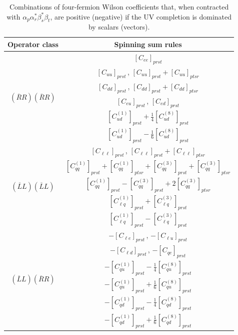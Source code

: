 \documentclass[a4paper,11pt]{article}
\begin{document}
\begin{table}[h!t!b!]
\renewcommand{\arraystretch}{1.5}
    \centering
    \begin{tabular}{cc}
    \toprule
    \rowcolor{hdrcolor}
    \textbf{Operator class} & \textbf{Spinning sum rules} \\
    \midrule
    \multirow{6}{*}{\boldmath$(\overline{R}R)(\overline{R}R)$} &
    $[C_{ee}]_{prst}$ \\
    & $[C_{uu}]_{prst}$\,, \qquad $[C_{uu}]_{prst} + [C_{uu}]_{ptsr}$ \\
    & $[C_{dd}]_{prst}$\,, \qquad $[C_{dd}]_{prst} + [C_{dd}]_{ptsr}$ \\
    & $[C_{eu}]_{prst}$\,, \qquad $[C_{ed}]_{prst}$ \\
    & $[C_{ud}^{(1)}]_{prst}+\tfrac{1}{4}[C_{ud}^{(8)}]_{prst}$ \\
    & $[C_{ud}^{(1)}]_{prst}-\tfrac{1}{6}[C_{ud}^{(8)}]_{prst}$ \\
    \midrule
    \multirow{5}{*}{\boldmath$(\overline{L}L)(\overline{L}L)$} &
    $[C_{\ell\ell}]_{prst}$\,, \qquad $[C_{\ell\ell}]_{prst} + [C_{\ell\ell}]_{ptsr}$ \\
    & $[C_{qq}^{(1)}]_{prst} + [C_{qq}^{(1)}]_{ptsr} + [C_{qq}^{(3)}]_{prst} + [C_{qq}^{(3)}]_{ptsr}$ \\
    & $[C_{qq}^{(1)}]_{prst} - [C_{qq}^{(3)}]_{prst} + 2[C_{qq}^{(3)}]_{ptsr}$ \\
    & $[C_{\ell q}^{(1)}]_{prst} + [C_{\ell q}^{(3)}]_{prst}$ \\
    & $[C_{\ell q}^{(1)}]_{prst} - [C_{\ell q}^{(3)}]_{prst}$ \\
    \midrule
    \multirow{6}{*}{\boldmath$(\overline{L}L)(\overline{R}R)$} &
    $-[C_{\ell e}]_{prst}$\,, \qquad $-[C_{\ell u}]_{prst}$ \\
    & $-[C_{\ell d}]_{prst}$\,, \qquad $-[C_{qe}]_{prst}$ \\
    & $-[C_{qu}^{(1)}]_{prst} - \tfrac{1}{4}[C_{qu}^{(8)}]_{prst}$ \\
    & $-[C_{qu}^{(1)}]_{prst} + \tfrac{1}{6}[C_{qu}^{(8)}]_{prst}$ \\
    & $-[C_{qd}^{(1)}]_{prst} - \tfrac{1}{4}[C_{qd}^{(8)}]_{prst}$ \\
    & $-[C_{qd}^{(1)}]_{prst} + \tfrac{1}{6}[C_{qd}^{(8)}]_{prst}$ \\
    \bottomrule
    \end{tabular}
    \caption{Combinations of four-fermion Wilson coefficients that, when contracted with $\alpha_p \alpha_r^* \beta^*_s \beta_t$, are positive (negative) if the UV completion is dominated by scalars (vectors).}
    \label{tab:sum_rules}
\end{table}
\end{document}

